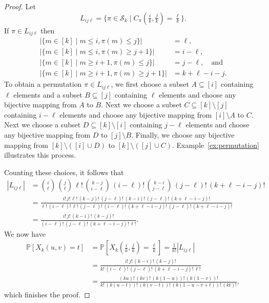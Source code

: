 \documentclass[12pt,a4paper]{amsart}
\theoremstyle{definition}
\newcommand{\SK}{\mathcal{S}_k}
\newcommand{\PP}{\mathbb{P}}
\begin{document}
\begin{proof}
Let 
\begin{equation}\label{eq:L_ijl}
     L_{ij\ell} = \{\pi \in \SK \mid C_\pi(\tfrac{i}{k},\tfrac{j}{k}) = \tfrac{\ell}{k}\}.
\end{equation}
If $\pi \in L_{ij\ell}$ then 
\begin{align*}
|\{m \in [k] \mid m\le i, \pi(m) \le j\}| &= \ell, \\
|\{m \in [k] \mid m\le i, \pi(m) \ge j+1\}| &= i-\ell, \\
|\{m \in [k] \mid m\ge i+1, \pi(m) \le j\}| &= j-\ell, \quad\text{and} \\
|\{m \in [k] \mid m\ge i+1, \pi(m) \ge j+1\}| &= k+\ell-i-j. 
\end{align*}
To obtain a permutation $\pi \in L_{ij\ell}$, we first choose a subset $A \subseteq [i]$ containing $\ell$ elements and a subset $B \subseteq [j]$ containing $\ell$ elements and choose any bijective mapping from $A$ to $B$. Next we choose a subset $C \subseteq [k]\setminus [j]$ containing $i-\ell$ elements and choose any bijective mapping from $[i]\setminus A$ to $C$. Next we choose a subset $D \subseteq [k]\setminus [i]$ containing $j-\ell$ elements and choose any bijective mapping from $D$ to $[j]\setminus B$. Finally, we choose any bijective mapping from $[k]\setminus([i]\cup D)$ to $[k]\setminus([j]\cup C)$. Example~\ref{ex:permutation}
illustrates this process. 

Counting these choices, it follows that 
\begin{align}
    |L_{ij\ell}|
    &= \binom{i}{\ell} \, \binom{j}{\ell} \, \ell! \, \binom{k-j}{i-\ell} \, (i-\ell)! \, \binom{k-i}{j-\ell} \, (j-\ell)! \,(k+\ell-i-j)! \nonumber\\
    &= \frac{i! \,j! \, \ell!\, (k-j)! \,(j-\ell)! \,(k-i)! \,(j-\ell)! \, (k+\ell-i-j)!}{\ell! \, (i-\ell)! \, \ell! \, (j-\ell)! \, (i-\ell)! \, (k+\ell-i-j)! \, (j-\ell)! \, (k+\ell-i-j)!} \label{eq:L_ijl_size}\\
    &= \frac{i! \, j! \, (k-i)! \, (k-j)!}{(i-\ell)! \, (j-\ell)! \, (k+\ell-i-j)! \, \ell!}. \nonumber
\end{align}
We now have
\begin{align*}
    \PP[X_k(u,v)=t] &= \PP[X_k(\tfrac{i}{k},\tfrac{j}{k})= \tfrac{\ell}{k}] = \frac{1}{k!} |L_{ij\ell}| \\
    &= \frac{i! \, j! \, (k-i)! \, (k-j)!}{k! \, (i-\ell)! \, (j-\ell)! \, (k+\ell-i-j)! \, \ell!} \\ 
    &= \frac{(ku)! \, (kv)! \, (k(1-u))! \, (k(1-v))!}{k! \, (k(u-t))! \, (k(v-t))! \, (k(1-u-v+t))! \, (kt)!},
\end{align*}
which finishes the proof. 
\end{proof}
\end{document}
